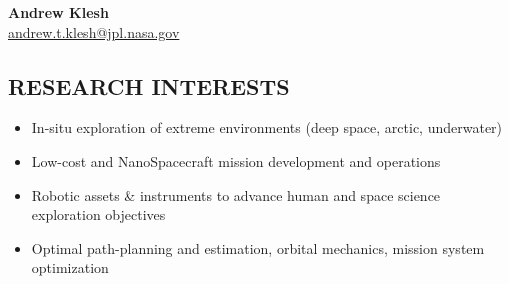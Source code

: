 \documentclass[11pt,letterpaper]{article}
\begin{document}
\begin{center}
    {\Huge\bfseries Andrew Klesh} \\[0.3em]
    {\large \href{mailto:andrew.t.klesh@jpl.nasa.gov}{andrew.t.klesh@jpl.nasa.gov}}
\end{center}

\vspace{0.5em}

\subsection*{RESEARCH INTERESTS}
\begin{itemize}
\item In-situ exploration of extreme environments (deep space, arctic, underwater)
\item Low-cost and NanoSpacecraft mission development and operations
\item Robotic assets \& instruments to advance human and space science exploration objectives
\item Optimal path-planning and estimation, orbital mechanics, mission system optimization
\end{itemize}
\end{document}
